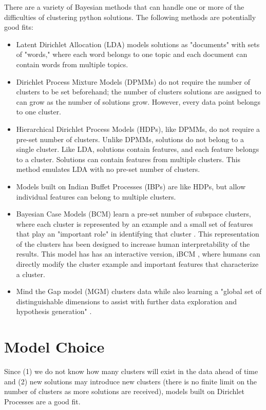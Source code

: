 There are a variety of Bayesian methods that can handle one or more of the difficulties of clustering python solutions. The following methods are potentially good fits: 
\begin{itemize}
\item Latent Dirichlet Allocation (LDA) models solutions as "documents" with sets of "words," where each word belongs to one topic and each document can contain words from multiple topics.
\item Dirichlet Process Mixture Models (DPMMs) do not require the number of clusters to be set beforehand; the number of clusters solutions are assigned to can grow as the number of solutions grow. However, every data point belongs to one cluster.
\item Hierarchical Dirichlet Process Models (HDPs), like DPMMs, do not require a pre-set number of clusters. Unlike DPMMs, solutions do not belong to a single cluster. Like LDA, solutions contain features, and each feature belongs to a cluster. Solutions can contain features from multiple clusters. This method emulates LDA with no pre-set number of clusters. 
\item Models built on Indian Buffet Processes (IBPs) \citet{finaleMastersThesis} are like HDPs, but allow individual features can belong to multiple clusters.
\item Bayesian Case Models (BCM) \citet{kimthesis} learn a pre-set number of subspace clusters, where each cluster is represented by an example and a small set of features that play an "important role" in identifying that cluster \citet{kimnips}. This representation of the clusters has been designed to increase human interpretability of the results. This model has has an interactive version, iBCM \cite{kimbcminteractive}, where humans can directly modify the cluster example and important features that characterize a cluster.
\item Mind the Gap model (MGM) clusters data while also learning a "global set of distinguishable dimensions to assist with further data exploration and hypothesis generation"  \citet{mgmnips}.
\end{itemize}

\section{Model Choice}

Since (1) we do not know how many clusters will exist in the data ahead of time and (2) new solutions may introduce new clusters (there is no finite limit on the number of clusters as more solutions are received), models built on Dirichlet Processes are a good fit. 

